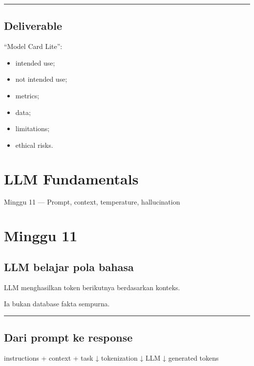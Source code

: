 \documentclass[
  indonesian,
  letterpaper,
  DIV=11,
  numbers=noendperiod]{scrreprt}
\newenvironment{Shaded}{\begin{snugshade}}{\end{snugshade}}
\newcommand{\NormalTok}[1]{\textcolor[rgb]{0.00,0.23,0.31}{#1}}
\providecommand{\tightlist}{%
  \setlength{\itemsep}{0pt}\setlength{\parskip}{0pt}}
\begin{document}
\begin{center}\rule{0.5\linewidth}{0.5pt}\end{center}

\section{Deliverable}\label{deliverable-4}

``Model Card Lite'':

\begin{itemize}
\tightlist
\item
  intended use;
\item
  not intended use;
\item
  metrics;
\item
  data;
\item
  limitations;
\item
  ethical risks.
\end{itemize}

\chapter{LLM Fundamentals}\label{llm-fundamentals}

Minggu 11 --- Prompt, context, temperature, hallucination

\hfill\break

\chapter{Minggu 11}\label{minggu-11}

\section{LLM belajar pola bahasa}\label{llm-belajar-pola-bahasa}

LLM menghasilkan token berikutnya berdasarkan konteks.

Ia bukan database fakta sempurna.

\begin{center}\rule{0.5\linewidth}{0.5pt}\end{center}

\section{Dari prompt ke response}\label{dari-prompt-ke-response}

\begin{Shaded}
\begin{Highlighting}[]
\NormalTok{instructions}
\NormalTok{+ context}
\NormalTok{+ task}
\NormalTok{    ↓}
\NormalTok{tokenization}
\NormalTok{    ↓}
\NormalTok{LLM}
\NormalTok{    ↓}
\NormalTok{generated tokens}
\end{Highlighting}
\end{Shaded}
\end{document}
